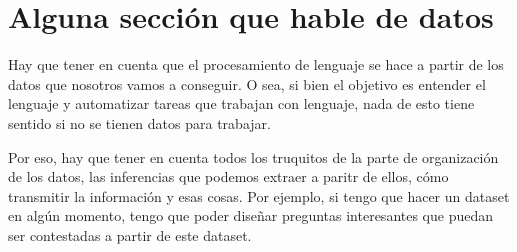
\section{Alguna sección que hable de datos}

Hay que tener en cuenta que el procesamiento de lenguaje se hace a partir de los datos que nosotros vamos a conseguir. O sea, si bien el objetivo es entender el lenguaje y automatizar tareas que trabajan con lenguaje, nada de esto tiene sentido si no se tienen datos para trabajar.

Por eso, hay que tener en cuenta todos los truquitos de la parte de organización de los datos, las inferencias que podemos extraer a paritr de ellos, cómo transmitir la información y esas cosas. Por ejemplo, si tengo que hacer un dataset en algún momento, tengo que poder diseñar preguntas interesantes que puedan ser contestadas a partir de este dataset.


